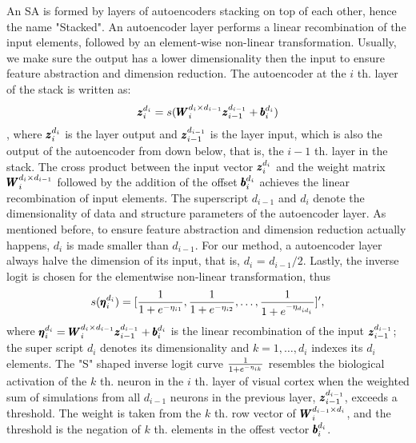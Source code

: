 An SA is formed by layers of autoencoders stacking on top of each other, hence the name "Stacked". An autoencoder layer performs a linear recombination of the input elements, followed by an element-wise non-linear transformation. Usually, we make sure the output has a lower dimensionality then the input to ensure feature abstraction and dimension reduction. The autoencoder at the $i$ th. layer of the stack is written as:
\begin{equation} \label{eq:AE}
    \pmb{z}_i^{d_i} = s(\pmb{W}_{i}^{d_{i} \times d_{i-1}} {\pmb{z}_{i-1}^{d_{i-1}}} + \pmb{b}_{i}^{d_{i}}) \\
\end{equation},
where ${\pmb{z}_{i}^{d_{i}}}$ is the layer output and ${\pmb{z}_{i-1}^{d_{i-1}}}$ is the layer input, which is also the output of the autoencoder from down below, that is, the $i-1$ th. layer in the stack. The cross product between the input vector ${\pmb{z}_{i}^{d_{i}}}$ and the weight matrix $\pmb{W}_{i}^{d_{i} \times d_{i-1}}$ followed by the addition of the offset $\pmb{b}_{i}^{d_{i}}$ achieves the linear recombination of input elements. The superscript $d_{i-1}$ and $d_i$ denote the dimensionality of data and structure parameters of the autoencoder layer. As mentioned before, to ensure feature abstraction and dimension reduction actually happens, $d_i$ is made smaller than $d_{i-1}$. For our method, a autoencoder layer always halve the dimension of its input, that is, $d_i$ = $d_{i-1}/2$. Lastly, the inverse logit is chosen for the elementwise non-linear transformation, thus
\begin{equation} \label{eq:InvLgt}
    s(\pmb{\eta}_i^{d_i})     = [\frac{1}{1+e^{-\eta_{i1}}}, \frac{1}{1+e^{-\eta_{i2}}}, \dots, \frac{1}{1+e^{-\eta_{d_{id_i}}}}]^{\prime},
\end{equation}
where $\pmb{\eta}_i^{d_i} = \pmb{W}_{i}^{d_{i} \times d_{i-1}} {\pmb{z}_{i-1}^{d_{i-1}}} + \pmb{b}_{i}^{d_{i}}$ is the linear recombination of the input ${\pmb{z}_{i-1}^{d_{i-1}}}$; the super script $d_i$ denotes its dimensionality and $k = 1, \dots, d_i$ indexes its $d_i$ elements. The "S" shaped inverse logit curve $\frac{1}{1+e^{-\eta_{ik}}}$ resembles the biological activation of the $k$ th. neuron in the $i$ th. layer of visual cortex when the weighted sum of simulations from all $d_{i-1}$ neurons in the previous layer, ${\pmb{z}_{i-1}^{d_{i-1}}}$, exceeds a threshold. The weight is taken from the $k$ th. row vector of $\pmb{W}_{i}^{d_{i-1} \times d_{i}}$,  and the threshold is the negation of $k$ th. elements in the offest vector $\pmb{b}_{i}^{d_{i}}$.

